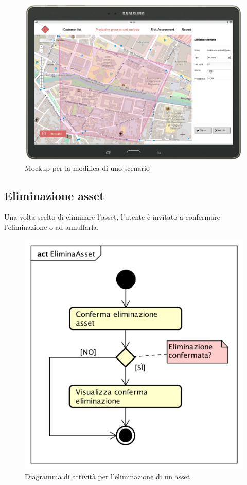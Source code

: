 \begin{figure}[H]
	\centering
	\includegraphics[width=\textwidth]{img/MockUp/m21.png}
	\caption{Mockup per la modifica di uno scenario}
\end{figure}

\newpage
\subsection{Eliminazione asset}
Una volta scelto di eliminare l'asset, l'utente è invitato a confermare l'eliminazione o ad annullarla.
\begin{figure}[H]
	\centering
	\includegraphics[scale=0.7]{img/DiagrammiDiAttivita/EliminazioneAsset.png}
	\caption{Diagramma di attività per l'eliminazione di un asset}
\end{figure}

